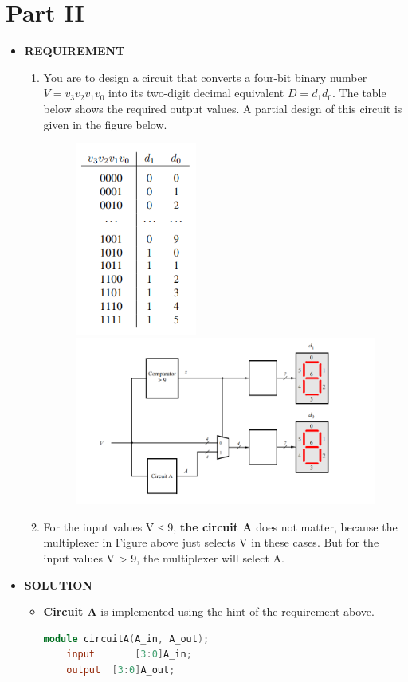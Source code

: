 \section{Part II}
\begin{itemize}
    \item [] \textbf{REQUIREMENT}
        \begin{enumerate}
            \item You are to design a circuit that converts a four-bit binary number $V = v_3v_2v_1v_0$ into its two-digit decimal equivalent $D = d_1d_0$. The table below shows the required output values. A partial design of this circuit is given in the figure below.
              \begin{figure}[h]
                \centering
                \hfill
                \includegraphics[width=4cm]{source/picture/Lab2/Lab2_table1.png}
                \hfill
                \includegraphics[width=10cm]{source/picture/Lab2/Lab2_figure1.png}
                \hfill
            \end{figure}
            \item  For the input values V ≤ 9, \textbf{the circuit A} does not matter, because the multiplexer in Figure above  just selects V in these cases. But for the input values V > 9, the multiplexer will select A.
        \end{enumerate}
    \item [] \textbf{SOLUTION}
        \begin{itemize}
            \item [] \textbf{Circuit A} is implemented using the hint of the requirement above.
                \begin{lstlisting}[language=verilog]
module circuitA(A_in, A_out);
	input		[3:0]A_in;
	output	[3:0]A_out;
	

\end{lstlisting}
\end{itemize}
\end{itemize}
